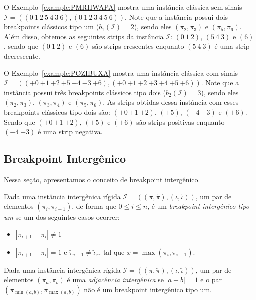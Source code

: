 O Exemplo~\ref{example:PMRHWAPA} mostra uma instância clássica sem sinais $\mathcal{I} = ((0~1~2~5~4~3~6),\allowbreak(0~1~2~3~4~5~6))$. Note que a instância possui dois breakpoints clássicos tipo um ($b_{1}(\mathcal{I}) = 2$), sendo eles $(\pi_2,\pi_3)$ e $(\pi_5,\pi_6)$. Além disso, obtemos as seguintes strips da instância $\mathcal{I}$: $(0~1~2)$, $(5~4~3)$ e $(6)$, sendo que $(0~1~2)$ e $(6)$ são strips crescentes enquanto $(5~4~3)$ é uma strip decrescente.



O Exemplo~\ref{example:POZIBUXA} mostra uma instância clássica com sinais $\mathcal{I} = \allowbreak(({+0}~{+1}~{+2}~{+5}~{-4}~{-3}\allowbreak~{+6}),\allowbreak({+0}~{+1}~{+2}~{+3}~{+4}~{+5}~{+6}))$. Note que a instância possui três breakpoints clássicos tipo dois ($b_{2}(\mathcal{I}) = 3$), sendo eles $(\pi_2,\pi_3)$, $(\pi_3,\pi_4)$ e $(\pi_5,\pi_6)$. As strips obtidas dessa instância com esses breakpoints clássicos tipo dois são: $({+0}~{+1}~{+2})$, $({+5})$, $({-4}~{-3})$ e $({+6})$. Sendo que $({+0}~{+1}~{+2})$, $({+5})$ e $({+6})$ são strips positivas enquanto $({-4}~{-3})$ é uma strip negativa.



\subsection{Breakpoint Intergênico}

Nessa seção, apresentamos o conceito de breakpoint intergênico.

\begin{definition}
  Dada uma instância intergênica rígida $\mathcal{I} = ((\pi,\breve\pi),(\iota,\breve\iota))$, um par de elementos $(\pi_{i}, \pi_{i+1})$, de forma que $0 \le i \le n$, é um \emph{breakpoint intergênico tipo um} se um dos seguintes casos ocorrer:
  \begin{itemize}
    \item $|\pi_{i+1} - \pi_{i}| \ne 1$
    \item $|\pi_{i+1} - \pi_{i}| = 1$ e $\breve\pi_{i+1} \ne \breve\iota_{x}$, tal que $x = \max(\pi_{i}, \pi_{i+1})$.
  \end{itemize}
\end{definition}

\begin{definition}
  Dada uma instância intergênica rígida $\mathcal{I} = ((\pi,\breve\pi),(\iota,\breve\iota))$, um par de elementos $(\pi_{a}, \pi_{b})$ é uma \emph{adjacência intergênica} se $|a-b|=1$ e o par $(\pi_{\min(a,b)}, \pi_{\max(a,b)})$ não é um breakpoint intergênico tipo um.
\end{definition}


